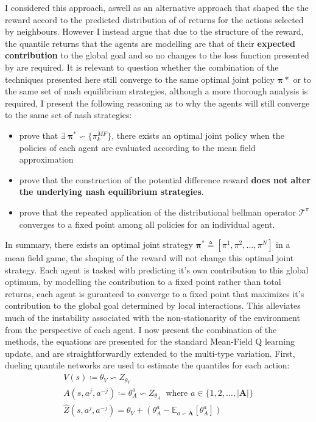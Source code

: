 I considered this approach, aswell as an alternative approach that shaped the the reward accord to the
predicted distribution of of returns for the actions selected by neighbours. However I instead argue that
due to the structure of the reward, the quantile returns that the agents are modelling are that of their
\textbf{expected contribution} to the global goal and so no changes to the loss function
presented by \cite{Sriram2020} are required. It is relevant to question whether the combination
of the techniques presented here still converge to the same optimal joint policy $\mathbf{\pi}*$ or 
to the same set of nash equilibrium strategies, although a more thorough analysis is required,
I present the following reasoning as to why the agents will still converge to the same set of
nash strategies:
\begin{itemize}
    \item \cite{Yang2018} prove that $\exists \: \boldsymbol \pi^* \backsim \{\pi_k^{MF}\}$, there exists
        an optimal joint policy when the policies of each agent are evaluated according to the
        mean field approximation
    \item \cite{Devlin2014} prove that the construction of the potential difference reward \textbf{does not
    alter the underlying nash equilibrium strategies}.
    \item \cite{Dabney2017} prove that the repeated application of the distributional bellman operator 
    $\mathcal{T}^\pi$ converges to a fixed point among all policies for an individual agent.
\end{itemize}
In summary, there exists an optimal joint strategy $\boldsymbol \pi^*  \triangleq [\pi^1, \pi^2, \hdots, \pi^N]$ in a mean field game,
the shaping of the reward will not change this optimal joint strategy. Each agent is tasked with predicting
it's own contribution to this global optimum, by modelling the contribution
to a fixed point rather than total returns, each agent is guranteed to converge to a fixed point that
maximizes it's contribution to the global goal determined by local interactions. This alleviates much of the instability associated with 
the non-stationarity of the environment from the perspective of each agent. 
I now present the combination of the methods, the equations are presented for the
standard Mean-Field Q learning update, and are straightforwardly extended to the 
multi-type variation.
First, dueling quantile networks are used to estimate the quantiles for each action:
\begin{equation}
    \begin{gathered}
        V(s) \coloneqq \theta_V \backsim Z_{\theta_V} \\
        A(s,a^j, a^{-j}) \coloneqq \theta_{A}^a  \backsim Z_{\theta_A}\;\; \text{where } a \in \{1,2, \hdots, \vert \mathbf{A} \vert \} \\
        \hat{Z}(s,a^j, a^{-j}) = \theta_V + (\theta_{A}^a - \mathbb{E}_{a \backsim \mathbf{A}}[\theta_{A}^{a}])
    \end{gathered}
\end{equation}
